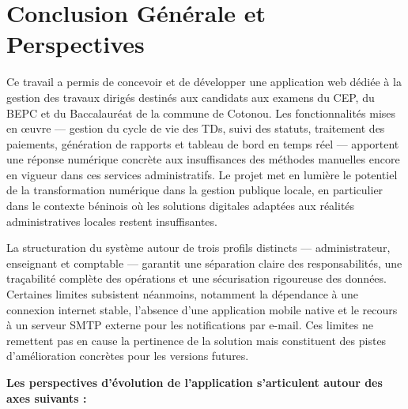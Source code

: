 
\chapter*{Conclusion Générale et Perspectives}

Ce travail a permis de concevoir et de développer une application web
dédiée à la gestion des travaux dirigés destinés aux candidats aux
examens du CEP, du BEPC et du Baccalauréat de la commune de Cotonou.
Les fonctionnalités mises en œuvre --- gestion du cycle de vie des TDs,
suivi des statuts, traitement des paiements, génération de rapports et
tableau de bord en temps réel --- apportent une réponse numérique
concrète aux insuffisances des méthodes manuelles encore en vigueur
dans ces services administratifs. Le projet met en lumière le potentiel
de la transformation numérique dans la gestion publique locale, en
particulier dans le contexte béninois où les solutions digitales
adaptées aux réalités administratives locales restent insuffisantes.

La structuration du système autour de trois profils distincts
--- administrateur, enseignant et comptable --- garantit une
séparation claire des responsabilités, une traçabilité complète
des opérations et une sécurisation rigoureuse des données.
Certaines limites subsistent néanmoins, notamment la dépendance
à une connexion internet stable, l'absence d'une application mobile
native et le recours à un serveur SMTP externe pour les notifications
par e-mail. Ces limites ne remettent pas en cause la pertinence
de la solution mais constituent des pistes d'amélioration
concrètes pour les versions futures.

\bigskip
\noindent\textbf{Les perspectives d'évolution de l'application
s'articulent autour des axes suivants :}

